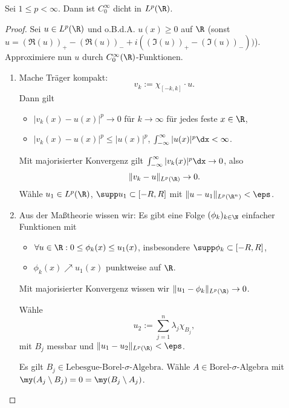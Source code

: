\begin{st} \label{4.18}
	Sei $1 \le p < \infty$.
	Dann ist $C_0^\infty$ dicht in $L^p(\R)$.
	\begin{proof}
		Sei $u \in L^p(\R)$ und o.B.d.A. $u(x) \ge 0$ auf $\R$ (sonst $u = (\Re(u))_+ - (\Re(u))_- + i((\Im(u))_+ - (\Im(u))_-))$).
		Approximiere nun $u$ durch $C_0^\infty(\R)$-Funktionen.
		\begin{enumerate}[1)]
			\item
				Mache Träger kompakt:
				\[
					v_k := \chi_{[-k,k]}\cdot u.
				\]
				Dann gilt
				\begin{itemize}
					\item
						$|v_k(x)-u(x)|^p \to 0$ für $k\to \infty$ für jedes feste $x \in \R$,
					\item
						$|v_k(x)-u(x)|^p \le |u(x)|^p$, $\int_{-\infty}^\infty |u(x)|^p \dx < \infty$.
				\end{itemize}
				Mit majorisierter Konvergenz gilt $\int_{-\infty}^\infty |v_k(x)|^p \dx \to 0$, also
				\[
					\|v_k - u\|_{L^p(\R)} \to 0.
				\]
				Wähle $u_1 \in L^p(\R)$, $\supp u_1 \subset [-R,R]$ mit $\|u-u_1\|_{L^p(\R^n)} < \eps$.
			\item
				Aus der Maßtheorie wissen wir: Es gibt eine Folge $(\phi_k)_{k\in \N}$ einfacher Funktionen mit
				\begin{itemize}
					\item
						$\forall u \in \R : 0 \le \phi_k(x) \le u_1(x)$, insbesondere $\supp \phi_k \subset [-R,R]$,
					\item
						$\phi_k(x) \nearrow u_1(x)$ punktweise auf $\R$.
				\end{itemize}
				Mit majorisierter Konvergenz wissen wir $\|u_1 - \phi_k\|_{L^p(\R)} \to 0$.

				Wähle 
				\[
					u_2 := \sum_{j=1}^n \lambda_j \chi_{B_j},
				\]
				mit $B_j$ messbar und $\|u_1-u_2\|_{L^p(\R)} < \eps$.

				Es gilt $B_j \in \text{Lebesgue-Borel-$\sigma$-Algebra}$.
				Wähle $A \in \text{Borel-$\sigma$-Algebra}$ mit $\my(A_j \setminus B_j) = 0 = \my(B_j \setminus A_j)$.


\end{enumerate}
\end{proof}
\end{st}
